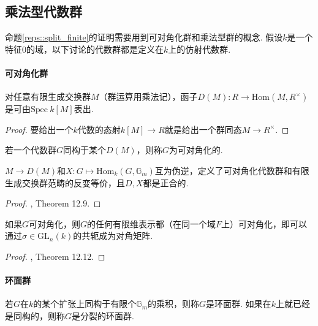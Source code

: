 \subsection{乘法型代数群}

命题\ref{reps::split_finite}的证明需要用到可对角化群和乘法型群的概念.
假设$k$是一个特征$0$的域，以下讨论的代数群都是定义在$k$上的仿射代数群.

\paragraph*{可对角化群}

\begin{cprop}
    对任意有限生成交换群$M$（群运算用乘法记），函子$D(M): R\to \mathrm{Hom}(M, R^{\times})$是可由$\mathrm{Spec}\ k[M]$表出.
\end{cprop}

\begin{proof}
    要给出一个$k$代数的态射$k[M]\to R$就是给出一个群同态$M\to R^{\times}$.
\end{proof}

\begin{cdef}
    若一个代数群$G$同构于某个$D(M)$，则称$G$为可对角化的.
\end{cdef}

\begin{cprop}
    $M\to D(M)$和$X: G\mapsto \mathrm{Hom}_k(G, \mathbb{G}_m)$互为伪逆，定义了可对角化代数群和有限生成交换群范畴的反变等价，且$D,X$都是正合的.
\end{cprop}

\begin{proof}
    \cite{milne2017algebraic}, Theorem 12.9.
\end{proof}

\begin{cprop}
    如果$G$可对角化，则$G$的任何有限维表示都（在同一个域$F$上）可对角化，即可以通过$\sigma\in\mathrm{GL}_n(k)$的共轭成为对角矩阵.
\end{cprop}

\begin{proof}
    \cite{milne2017algebraic}, Theorem 12.12.
\end{proof}

\paragraph*{环面群}

\begin{cdef}
    若$G$在$k$的某个扩张上同构于有限个$\mathbb{G}_m$的乘积，则称$G$是环面群. 如果在$k$上就已经是同构的，则称$G$是分裂的环面群.
\end{cdef}

